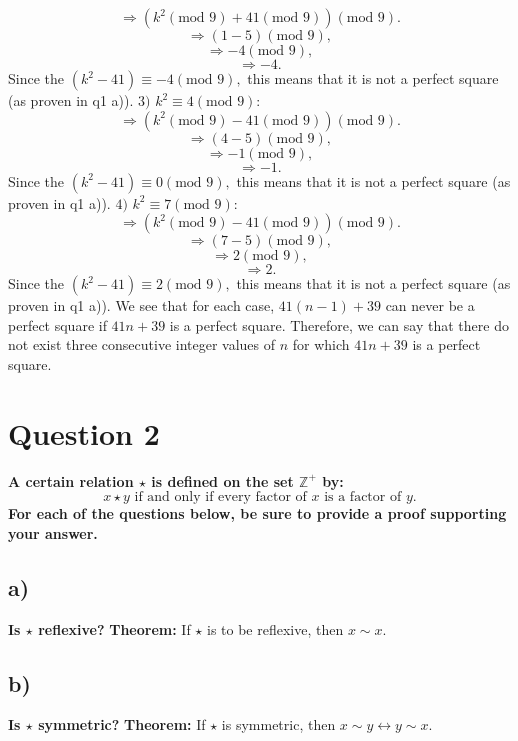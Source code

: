 \documentclass{article}
\begin{document}
$$\Rightarrow (k^2 (\text{mod } 9) + 41 (\text{mod } 9)) (\text{mod } 9).$$
$$\Rightarrow (1 - 5) (\text{mod } 9),$$
$$\Rightarrow -4 (\text{mod } 9),$$
$$\Rightarrow -4.$$
Since the $(k^2 - 41) \equiv -4 (\text{mod } 9),$ this means that it is not a perfect square (as proven in q1 a)).
\newline
$3) $ $k^2 \equiv 4 (\text{mod } 9)$:
\newline
\newline
$$\Rightarrow (k^2 (\text{mod } 9) - 41 (\text{mod } 9)) (\text{mod } 9).$$
$$\Rightarrow (4 - 5) (\text{mod } 9),$$
$$\Rightarrow -1 (\text{mod } 9),$$
$$\Rightarrow -1.$$
Since the $(k^2 - 41) \equiv 0 (\text{mod } 9),$ this means that it is not a perfect square (as proven in q1 a)).
\newline
$4) $ $k^2 \equiv 7 (\text{mod } 9)$:
\newline
\newline
$$\Rightarrow (k^2 (\text{mod } 9) - 41 (\text{mod } 9)) (\text{mod } 9).$$
$$\Rightarrow (7 - 5) (\text{mod } 9),$$
$$\Rightarrow 2 (\text{mod } 9),$$
$$\Rightarrow 2.$$
Since the $(k^2 - 41) \equiv 2 (\text{mod } 9),$ this means that it is not a perfect square (as proven in q1 a)).
\newline
We see that for each case, $41(n - 1) + 39$ can never be a perfect square if $41n + 39$ is a perfect square.
\newline
\newline
Therefore, we can say that there do not exist three consecutive integer values of $n$ for which $41n + 39$ is a perfect square.
\newpage
\section{Question 2}
\textbf{ A certain relation $\star$ is defined on the set $\mathbb{Z}^+$ by:
\newline
$$x \star y \text{ if and only if every factor of } x \text{ is a factor of } y.$$
For each of the questions below, be sure to provide a proof supporting your answer. }
\subsection{a)}
\textbf{ Is $\star $ reflexive? }
\newline
\newline
\textbf{Theorem: } If $\star$ is to be reflexive, then $x \sim x.$
\newline
{}
\newpage
\subsection{b)}
\textbf{Is $\star $ symmetric?}
\newline
\newline
\textbf{Theorem: } If $\star$ is symmetric, then $x \sim y \leftrightarrow y \sim x.$
\newline
{}
\newpage
\end{document}
